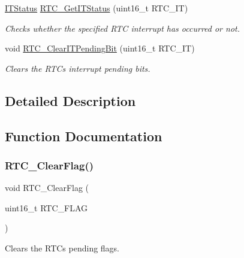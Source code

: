 \begin{DoxyCompactItemize}
\hyperlink{group___exported__types_gaacbd7ed539db0aacd973a0f6eca34074}{I\+T\+Status} \hyperlink{group___r_t_c___private___functions_ga23274ad8aa28e86d5b0d58eee295db21}{R\+T\+C\+\_\+\+Get\+I\+T\+Status} (uint16\+\_\+t R\+T\+C\+\_\+\+IT)
\begin{DoxyCompactList}\small\item\em Checks whether the specified R\+TC interrupt has occurred or not. \end{DoxyCompactList}\item 
void \hyperlink{group___r_t_c___private___functions_ga62b9a04d89a11f28db7dcfd50d9ee768}{R\+T\+C\+\_\+\+Clear\+I\+T\+Pending\+Bit} (uint16\+\_\+t R\+T\+C\+\_\+\+IT)
\begin{DoxyCompactList}\small\item\em Clears the R\+TC\textquotesingle{}s interrupt pending bits. \end{DoxyCompactList}\end{DoxyCompactItemize}


\subsection{Detailed Description}


\subsection{Function Documentation}
\mbox{\label{group___r_t_c___private___functions_gacefb05730a77ffaa273c1ac3ade1a22f}} 
\subsubsection{\texorpdfstring{R\+T\+C\+\_\+\+Clear\+Flag()}{RTC\_ClearFlag()}}
{\footnotesize\ttfamily void R\+T\+C\+\_\+\+Clear\+Flag (\begin{DoxyParamCaption}\item[{uint16\+\_\+t}]{R\+T\+C\+\_\+\+F\+L\+AG }\end{DoxyParamCaption})}



Clears the R\+TC\textquotesingle{}s pending flags. 


